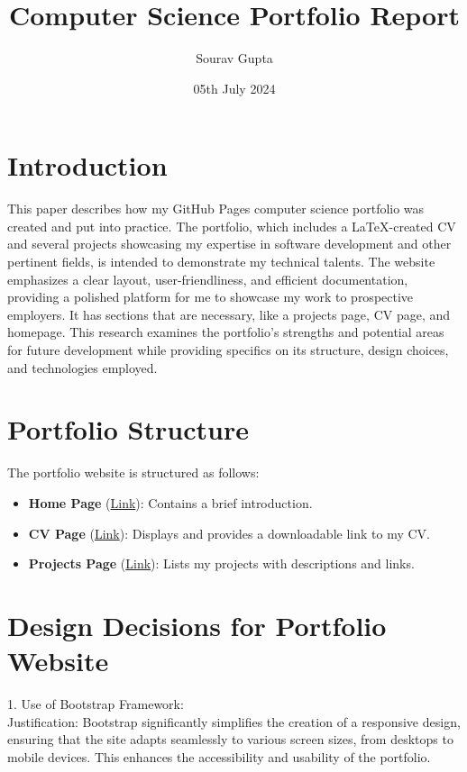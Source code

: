 \documentclass{article}
\title{Computer Science Portfolio Report}
\author{Sourav Gupta}
\date{05th July 2024}
\begin{document}
\maketitle

\section{Introduction}

This paper describes how my GitHub Pages computer science portfolio was created and put into practice. The portfolio, which includes a LaTeX-created CV and several projects showcasing my expertise in software development and other pertinent fields, is intended to demonstrate my technical talents. The website emphasizes a clear layout, user-friendliness, and efficient documentation, providing a polished platform for me to showcase my work to prospective employers. It has sections that are necessary, like a projects page, CV page, and homepage. This research examines the portfolio's strengths and potential areas for future development while providing specifics on its structure, design choices, and technologies employed.


\section{Portfolio Structure}
The portfolio website is structured as follows:
\begin{itemize}
    \item \textbf{Home Page} (\href{https://souravgupta166.github.io/}{Link}): Contains a brief introduction.
    \item \textbf{CV Page} (\href{https://souravgupta166.github.io/Sourav_Latex_CV.pdf}{Link}): Displays and provides a downloadable link to my CV.
    \item \textbf{Projects Page} (\href{https://souravgupta166.github.io/PowerBI%20Dashboards.pdf}{Link}): Lists my projects with descriptions and links.
    
\end{itemize}

\section{
Design Decisions for Portfolio Website}
1. Use of Bootstrap Framework:
\\
Justification: Bootstrap significantly simplifies the creation of a responsive design, ensuring that the site adapts seamlessly to various screen sizes, from desktops to mobile devices. This enhances the accessibility and usability of the portfolio.
\end{document}
